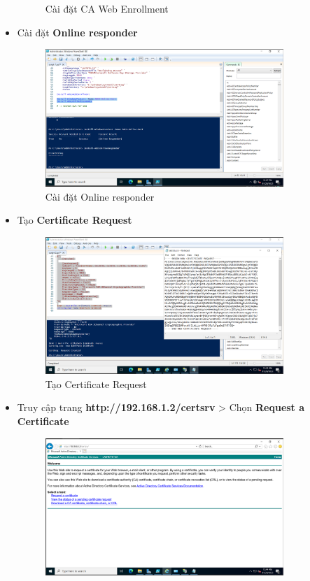 \documentclass[13pt]{report}
\begin{document}
\begin{itemize}
\begin{figure}[htp]
			\caption{Cài đặt CA Web Enrollment}
		\end{figure}
		\newpage
		\item Cài đặt \textbf{Online responder}
		\begin{figure}[htp]
			\centering
			\includegraphics[width=0.85\textwidth]{image/PowerShell/ADCS/4.png}
			\caption{Cài đặt Online responder}
		\end{figure}
		\item Tạo \textbf{Certificate Request}
		\begin{figure}[htp]
			\centering
			\includegraphics[width=0.85\textwidth]{image/PowerShell/ADCS/5.png}
			\caption{Tạo Certificate Request}
		\end{figure}
		\newpage
		\item Truy cập trang  \textbf{http://192.168.1.2/certsrv} > Chọn \textbf{Request a Certificate}
		\begin{figure}[htp]
			\centering
			\includegraphics[width=0.85\textwidth]{image/PowerShell/ADCS/6.png}

\end{figure}
\end{itemize}
\end{document}
